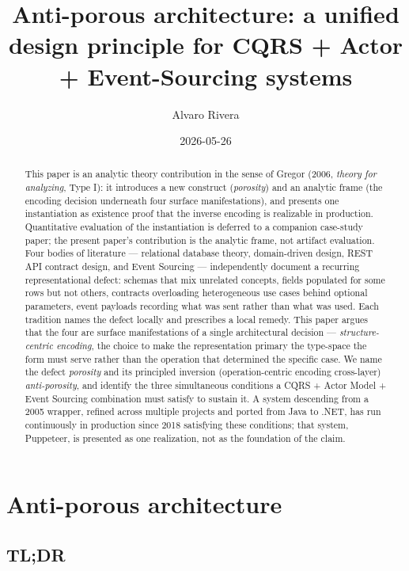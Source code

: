 \documentclass[
]{article}
\title{Anti-porous architecture: a unified design principle for CQRS +
Actor + Event-Sourcing systems}
\author{Alvaro Rivera}
\date{2026-05-26}
\begin{document}
\maketitle
\begin{abstract}
This paper is an analytic theory contribution in the sense of Gregor
(2006, \emph{theory for analyzing}, Type I): it introduces a new
construct (\emph{porosity}) and an analytic frame (the encoding decision
underneath four surface manifestations), and presents one instantiation
as existence proof that the inverse encoding is realizable in
production. Quantitative evaluation of the instantiation is deferred to
a companion case-study paper; the present paper's contribution is the
analytic frame, not artifact evaluation. Four bodies of literature ---
relational database theory, domain-driven design, REST API contract
design, and Event Sourcing --- independently document a recurring
representational defect: schemas that mix unrelated concepts, fields
populated for some rows but not others, contracts overloading
heterogeneous use cases behind optional parameters, event payloads
recording what was sent rather than what was used. Each tradition names
the defect locally and prescribes a local remedy. This paper argues that
the four are surface manifestations of a single architectural decision
--- \emph{structure-centric encoding}, the choice to make the
representation primary the type-space the form must serve rather than
the operation that determined the specific case. We name the defect
\emph{porosity} and its principled inversion (operation-centric encoding
cross-layer) \emph{anti-porosity}, and identify the three simultaneous
conditions a CQRS + Actor Model + Event Sourcing combination must
satisfy to sustain it. A system descending from a 2005 wrapper, refined
across multiple projects and ported from Java to .NET, has run
continuously in production since 2018 satisfying these conditions; that
system, Puppeteer, is presented as one realization, not as the
foundation of the claim.
\end{abstract}

\section{Anti-porous architecture}\label{anti-porous-architecture}

\subsection{TL;DR}\label{tldr}
\end{document}
